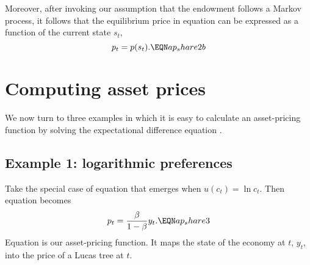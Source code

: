 Moreover, after invoking our assumption that the endowment follows
a Markov process, it follows that the equilibrium price in equation
 can be expressed as a function of the current state
$s_t\!$,
$$
p_t = p(s_t).                                          \EQN ap_share2b
$$



\section{Computing asset prices}

  We now turn to three examples in which it is easy to calculate
an asset-pricing function by solving the expectational difference
equation .

\subsection{Example 1: logarithmic preferences}

Take the special case of equation  that emerges
when $u(c_t)=\ln c_t$. Then equation   becomes
$$p_t = {\be\over 1-\be} y_t.             \EQN ap_share3  $$
Equation  is our  asset-pricing function. It maps the
state of the economy at $t$, $y_t$, into the price of a Lucas tree at $t$.
